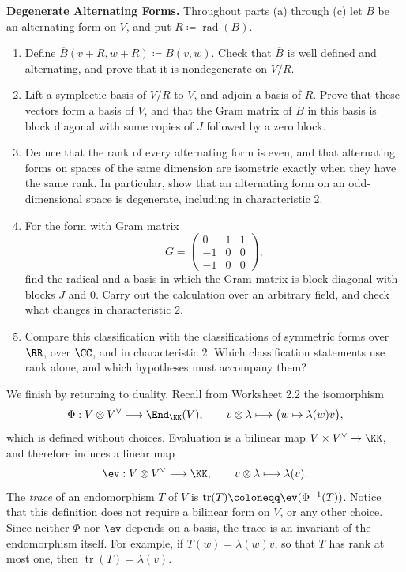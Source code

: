 \documentclass[12pt,reqno]{amsart}
\DeclareMathOperator{\tr}{tr}
\DeclareMathOperator{\rad}{rad}
\begin{document}
\hrulefill

\begin{problems}
\item\label{b:degenerate} \textbf{Degenerate Alternating Forms.} Throughout parts (a) through (c) let $B$ be an alternating form on $V$, and put $R\coloneqq\rad(B)$.
\begin{enumerate}
\item Define $\overline B(v+R,w+R)\coloneqq B(v,w)$. Check that $\overline B$ is well defined and alternating, and prove that it is nondegenerate on $V/R$.
\item Lift a symplectic basis of $V/R$ to $V$, and adjoin a basis of $R$. Prove that these vectors form a basis of $V$, and that the Gram matrix of $B$ in this basis is block diagonal with some copies of $J$ followed by a zero block.
\item Deduce that the rank of every alternating form is even, and that alternating forms on spaces of the same dimension are isometric exactly when they have the same rank. In particular, show that an alternating form on an odd-dimensional space is degenerate, including in characteristic $2$.
\item For the form with Gram matrix
\[
G=\begin{pmatrix}0&1&1\\-1&0&0\\-1&0&0\end{pmatrix},
\]
find the radical and a basis in which the Gram matrix is block diagonal with blocks $J$ and $0$. Carry out the calculation over an arbitrary field, and check what changes in characteristic $2$.
\item Compare this classification with the classifications of symmetric forms over $\RR$, over $\CC$, and in characteristic $2$. Which classification statements use rank alone, and which hypotheses must accompany them?
\end{enumerate}
\end{problems}

\hrulefill

We finish by returning to duality. Recall from Worksheet 2.2 the isomorphism
\[
\Phi:V\otimes V^{\vee}\longrightarrow\End_{\KK}(V),\qquad v\otimes\lambda\longmapsto\bigl(w\mapsto\lambda(w)v\bigr),
\]
which is defined without choices. Evaluation is a bilinear map $V\times V^{\vee}\to\KK$, and therefore induces a linear map
\[
\ev:V\otimes V^{\vee}\longrightarrow\KK,\qquad v\otimes\lambda\longmapsto\lambda(v).
\]
The \emph{trace} of an endomorphism $T$ of $V$ is $\tr(T)\coloneqq\ev(\Phi^{-1}(T))$. Notice that this definition does not require a bilinear form on $V$, or any other choice. Since neither $\Phi$ nor $\ev$ depends on a basis, the trace is an invariant of the endomorphism itself. For example, if $T(w)=\lambda(w)v$, so that $T$ has rank at most one, then $\tr(T)=\lambda(v)$.
\end{document}
